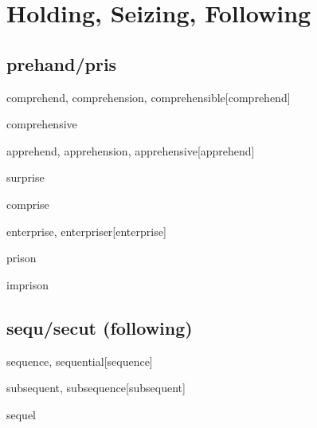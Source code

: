 \chapter{Holding, Seizing, Following}

\section{prehand/pris}

\begin{wordRef}{comprehend, comprehension, comprehensible}[comprehend]
\end{wordRef}

\begin{wordRef}{comprehensive}
\end{wordRef}

\begin{wordRef}{apprehend, apprehension, apprehensive}[apprehend]
\end{wordRef}

\begin{wordRef}{surprise}
\end{wordRef}

\begin{wordRef}{comprise}
\end{wordRef}

\begin{wordRef}{enterprise, enterpriser}[enterprise]
\end{wordRef}

\begin{wordRef}{prison}
\end{wordRef}

\begin{wordRef}{imprison}
\end{wordRef}

\section{sequ/secut (following)}

\begin{wordRef}{sequence, sequential}[sequence]
\end{wordRef}

\begin{wordRef}{subsequent, subsequence}[subsequent]
\end{wordRef}

\begin{wordRef}{sequel}
\end{wordRef}

